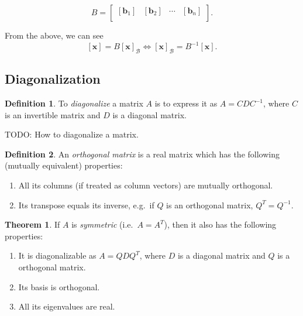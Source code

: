 \documentclass[10pt]{scrartcl}
\numberwithin{equation}{subsection}
\theoremstyle{definition}
\newtheorem{definition}{Definition}[section]
\newtheorem{theorem}{Theorem}[section]
\theoremstyle{remark}
\newenvironment{definitionSR}
{
\begin{siderules}
\begin{definition}
}
{
\end{definition}
\end{siderules}
}
\newenvironment{theoremSR}
{
\begin{siderules}
\begin{theorem}
}
{
\end{theorem}
\end{siderules}
}
\newcommand{\ve}[1]{
	\mathbf{#1}
}
\newcommand{\cvb}[1]{
	[\mathbf{#1}]
}
\newcommand{\inv}[1]{
	{#1}^{-1}
}
\begin{document}
\begin{equation}
B = \begin{bmatrix} 
[\ve{b}_1]&[\ve{b}_2]& \cdots & [\ve{b}_n]\\

\end{bmatrix}.
\end{equation}

From the above, we can see
\begin{equation}
\cvb{x} = B\cvb{x}_\mathcal{B} \iff \cvb{x}_\mathcal{B} = \inv{B}\cvb{x}.
\end{equation}

\subsection{Diagonalization}
\begin{definitionSR}
To \textit{diagonalize} a matrix $A$ is to express it as $A=CD\inv{C}$, where
$C$ is an invertible matrix and $D$ is a diagonal matrix.
\end{definitionSR}
TODO: How to diagonalize a matrix.

\begin{definitionSR}
An \textit{orthogonal matrix} is a real matrix which has the following (mutually equivalent) properties:
\begin{enumerate}
\item All its columns (if treated as column vectors) are mutually orthogonal.
\item Its transpose equals its inverse, e.g.\ if $Q$ is an orthogonal matrix, $Q^T = \inv{Q}$.
\end{enumerate}

\end{definitionSR}

\begin{theoremSR}
	If $A$ is \textit{symmetric} (i.e.\ $A = A^T$), then it also has the following properties:
	\begin{enumerate}
	\item It is diagonalizable as $A=QDQ^T$, where $D$ is a diagonal matrix and $Q$ is a orthogonal matrix.
	\item Its basis is orthogonal.
	\item All its eigenvalues are real.
	\end{enumerate}
\end{theoremSR}
\end{document}
